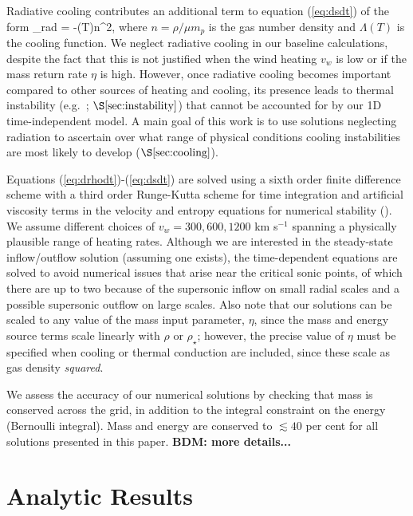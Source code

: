 \documentclass[usenatbib,fleqn]{mn2e}
\newcommand{\vwO}{v_{w}}
\begin{document}
Radiative cooling contributes an additional term to equation (\ref{eq:dsdt}) of the form
\be
{}_{\rm rad} = -\Lambda(T)n^{2},
\label{eq:qdot_rad}
\ee
where $n = \rho/\mu m_p$ is the gas number density and $\Lambda(T)$ is the cooling function.  We neglect radiative cooling in our baseline calculations, despite the fact that this is not justified when the wind heating $\vwO$ is low or if the mass return rate $\eta$ is high.  However, once radiative cooling becomes important compared to other sources of heating and cooling, its presence leads to thermal instability (e.g.~\citealt{McCourt+12}; $\S\ref{sec:instability}$) that cannot be accounted for by our 1D
time-independent model.  A main goal of this work is to use solutions neglecting radiation to ascertain over what range of physical conditions cooling instabilities are most likely to develop ($\S\ref{sec:cooling}$).

Equations (\ref{eq:drhodt})-(\ref{eq:dsdt}) are solved using a sixth
order finite difference scheme with a third order Runge-Kutta scheme
for time integration and artificial viscosity terms in the velocity
and entropy equations for numerical stability
(\citealt{Brandenburg:2003a}).  We assume different
choices of $v_{w} = 300, 600, 1200$ km s$^{-1}$ spanning a
physically plausible range of heating rates.  Although we are interested in the steady-state inflow/outflow solution (assuming one exists), the time-dependent equations are solved to avoid numerical issues that arise near the critical sonic points, of which there are up to two because of the supersonic
inflow on small radial scales and a possible supersonic outflow on large scales.  Also note that our solutions can be scaled to any value of the mass input parameter, $\eta$, since the mass and energy source terms scale linearly with $\rho$ or $\rho_{\star}$; however, the precise value of $\eta$ must be specified when cooling or thermal conduction are included, since these scale as gas density {\it squared}. 

We assess the accuracy of our numerical solutions by checking that mass is conserved across the grid, in addition to the integral constraint on the energy (Bernoulli integral).  Mass and energy are conserved to $\lesssim
40$ per cent for all solutions presented in this paper.  {\bf BDM:
  more details...}


\section{Analytic Results}
\label{sec:results}
\end{document}

